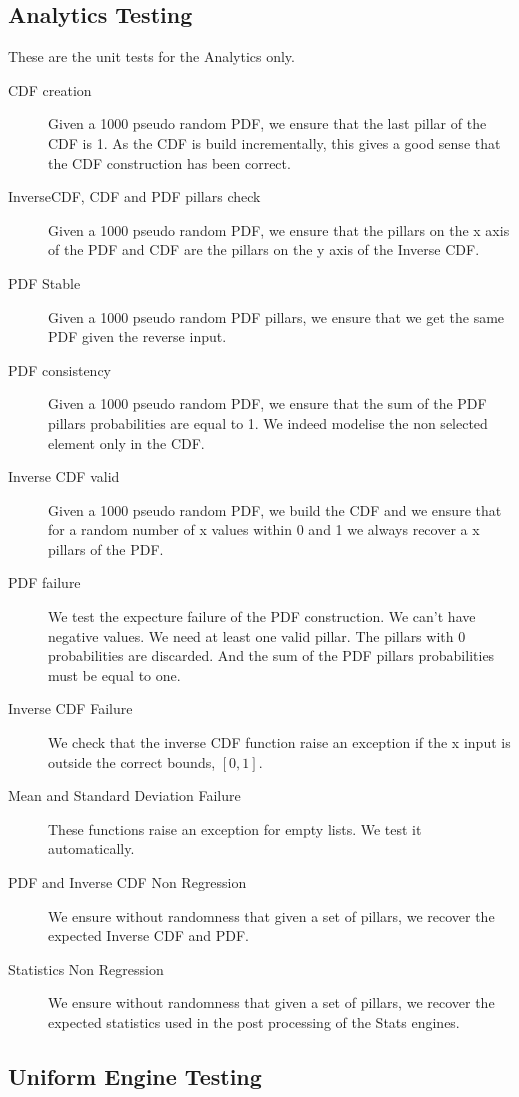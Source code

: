 \documentclass[12pt,a4paper,article]{memoir} %
\begin{document}
\subsection{Analytics Testing} 
These are the unit tests for the Analytics only.
\begin{description}
	\item [CDF creation]
		Given a 1000 pseudo random PDF, we ensure 
		that the last pillar of the CDF is 1.
		As the CDF is build incrementally, this gives a good sense that
		the CDF construction has been correct.
	\item [InverseCDF, CDF and PDF pillars check]
		Given a 1000 pseudo random PDF, we ensure that
		the pillars on the x axis of the PDF and CDF are the pillars on the y
		axis of the Inverse CDF.
	\item [PDF Stable]
		Given a 1000 pseudo random PDF pillars, 
		we ensure that we get the same PDF given the reverse input.
	\item [PDF consistency]
		Given a 1000 pseudo random PDF, 
		we ensure that the sum of the PDF pillars probabilities are 
		equal to 1. We indeed modelise the non selected element
		only in the CDF.
	\item [Inverse CDF valid]
		Given a 1000 pseudo random PDF,
		we build the CDF and we ensure that for a random number of
		x values within 0 and 1 we always recover a x pillars of the PDF.
	\item [PDF failure]
		We test the expecture failure of the PDF construction. 
		We can't have negative values. We need at least one valid pillar.
		The pillars with 0 probabilities are discarded.
		And the sum of the PDF pillars probabilities must be 
		equal to one.
	\item [Inverse CDF Failure]
		We check that the inverse CDF function raise an
		exception if the x input is outside the correct bounds, 
		$\left[0, 1\right]$.
	\item [Mean and Standard Deviation Failure]
		These functions raise an exception for empty lists.
		We test it automatically.
	\item [PDF and Inverse CDF Non Regression]
		We ensure without randomness that given a set of pillars,
		we recover the expected Inverse CDF and PDF.
	\item [Statistics Non Regression]
		We ensure without randomness that given a set of pillars,
		we recover the expected statistics used in the post processing
		of the Stats engines.
\end{description}
\subsection{Uniform Engine Testing} 
\end{document}
